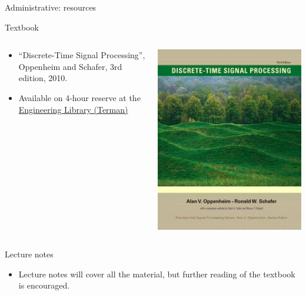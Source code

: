 \documentclass[10pt]{beamer}
\begin{document}
%
\begin{frame}{Administrative: resources}
\begin{block}{Textbook}
\begin{columns}[t]
	\begin{column}{0.8\textwidth}
		\begin{itemize}
			\item ``Discrete-Time Signal Processing'', Oppenheim and Schafer, 3rd edition, 2010.
			\item Available on 4-hour reserve at the \href{https://campus-map.stanford.edu/?id=04-080&lat=37.42787956&lng=-122.17429865&zoom=17&srch=engineeri}{Engineering Library (Terman)}
		\end{itemize}
	\end{column}
	\begin{column}{0.25\textwidth}  %
		\vspace{-1cm}
		\begin{center}
			\includegraphics[width=\textwidth]{figs/book_cover.jpg}
		\end{center}
	\end{column}
\end{columns}
\end{block}
\vspace{-0.5cm}
\begin{block}{Lecture notes}
	\begin{itemize}
		\item Lecture notes will cover all the material, but further reading of the textbook is encouraged.
	\end{itemize}
\end{block}


\end{frame}
\end{document}
